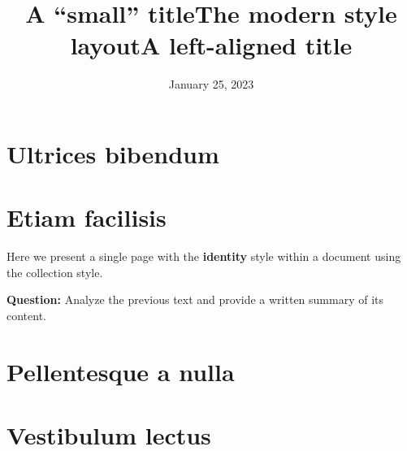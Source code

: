 \documentclass[a4paper,11pt]{article}
\renewcommand{\titlestyle}{\Huge} %
\begin{document}
\section*{Ultrices bibendum}
\lipsum
\lipsum[1-3]
\section*{Etiam facilisis}
\lipsum[1-5]

\newpage
\hypertarget{schooldocs-example-identity}{}

\thispagestyle{identity}
Here we present a single page with the \textbf{identity} style
within a document using the collection style.
\par\medskip
\textbf{Question:} Analyze the previous text and provide a written summary of its content.

\newpage
\lfoot{}
\cfoot{\thepage}
\rfoot{}
\renewcommand{\subjectstyle}{}
\renewcommand{\authorstyle}{}
\renewcommand{\datestyle}{}
\hypertarget{schooldocs-example-small-identity}{}

\setcounter{page}{1}
\renewcommand{\titlestyle}{\LARGE\bfseries}
\renewcommand\subjectstyle{\large}
\renewcommand{\headrulewidth}{0pt}
\setlength{\titletopskip}{-1.32cm}
\setlength\titlesep{2\medskipamount}
\title{A ``small'' title}
\date{January 25, 2023}
\thispagestyle{identity}
\schooldocstitles
\makesmalltitle
\lipsum[1]

\newpage
\hypertarget{schooldocs-example-modern-small-identity}{}

\setcounter{page}{1}
\setcounter{section}{0}
\title[The modern style]{The modern style layout}
\pagestyle{modern}
\thispagestyle{identity}
\makesmalltitle
\section*{Pellentesque a nulla}
\lipsum[1-3]
\section*{Vestibulum lectus}
\lipsum[5-6]

\newpage
\hypertarget{schooldocs-example-left-identity}{}

\setcounter{page}{1}
\lfoot{}
\cfoot{}
\rfoot{}
\renewcommand{\titleflush}{flushleft}
\title{A left-aligned title}
\pagestyle{empty}
\thispagestyle{identity}
\schooldocstitles
\maketitle
\lipsum[1]

\setcounter{page}{2} %
\end{document}
